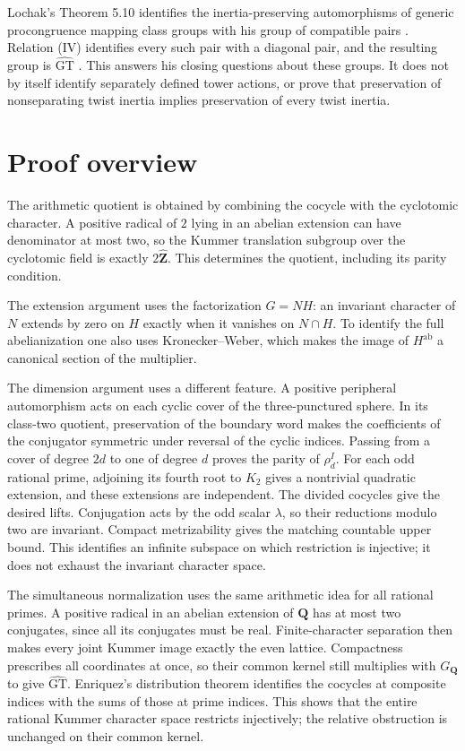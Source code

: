 \documentclass[11pt,a4paper]{article}
\theoremstyle{definition}
\theoremstyle{remark}
\newcommand{\GT}{\widehat{\mathrm{GT}}}
\newcommand{\Zh}{\widehat{\mathbf Z}}
\newcommand{\Q}{\mathbf Q}
\newcommand{\ab}{\mathrm{ab}}
\begin{document}
Lochak's Theorem 5.10 identifies the inertia-preserving automorphisms of generic procongruence mapping class groups with his group of compatible pairs \cite[Definition 5.4, Theorem 5.10]{Lochak2025}. Relation (IV) identifies every such pair with a diagonal pair, and the resulting group is $\GT$ \cite[Corollary 22]{H17}. This answers his closing questions about these groups. It does not by itself identify separately defined tower actions, or prove that preservation of nonseparating twist inertia implies preservation of every twist inertia.

\section{Proof overview}
The arithmetic quotient is obtained by combining the cocycle with the cyclotomic character. A positive radical of $2$ lying in an abelian extension can have denominator at most two, so the Kummer translation subgroup over the cyclotomic field is exactly $2\Zh$. This determines the quotient, including its parity condition.

The extension argument uses the factorization $G=NH$: an invariant character of $N$ extends by zero on $H$ exactly when it vanishes on $N\cap H$. To identify the full abelianization one also uses Kronecker--Weber, which makes the image of $H^{\ab}$ a canonical section of the multiplier.

The dimension argument uses a different feature. A positive peripheral automorphism acts on each cyclic cover of the three-punctured sphere. In its class-two quotient, preservation of the boundary word makes the coefficients of the conjugator symmetric under reversal of the cyclic indices. Passing from a cover of degree $2d$ to one of degree $d$ proves the parity of $\rho_d^I$. For each odd rational prime, adjoining its fourth root to $K_2$ gives a nontrivial quadratic extension, and these extensions are independent. The divided cocycles give the desired lifts. Conjugation acts by the odd scalar $\lambda$, so their reductions modulo two are invariant. Compact metrizability gives the matching countable upper bound. This identifies an infinite subspace on which restriction is injective; it does not exhaust the invariant character space.

The simultaneous normalization uses the same arithmetic idea for all rational primes. A positive radical in an abelian extension of $\Q$ has at most two conjugates, since all its conjugates must be real. Finite-character separation then makes every joint Kummer image exactly the even lattice. Compactness prescribes all coordinates at once, so their common kernel still multiplies with $G_\Q$ to give $\GT$. Enriquez's distribution theorem identifies the cocycles at composite indices with the sums of those at prime indices. This shows that the entire rational Kummer character space restricts injectively; the relative obstruction is unchanged on their common kernel.
\end{document}
